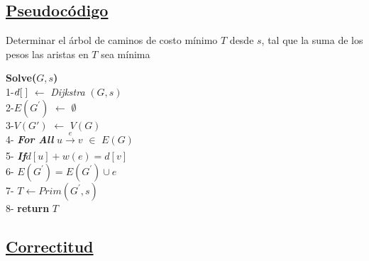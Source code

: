 \documentclass{article}
\begin{document}
    \subsection{\underline{Pseudoc\'odigo}}

    \begin{algorithm}[H]
        \caption{Determinar el \'arbol de caminos de costo m\'inimo $T$ desde $s$, tal que la suma de los pesos las aristas en $T$ sea m\'inima}
        \textbf{Solve($G,s$)}\\ 
        1-\hspace*{0.5em}$d[\hspace*{0.1cm}]$ $\leftarrow $ \textit{Dijkstra} $\left(G,s\right)$ \\  
        2-\hspace*{0.5em}$E (G^{'})$ $\leftarrow$ $\emptyset$ \\ 
        3-\hspace*{0.5em}$V(G')$ $\leftarrow$ $V(G)$\\ 
        4-\hspace*{0.5em} \textbf{\textit{For All }} $u \xrightarrow[]{e} v$  $\in$ $E(G)$\\ 
        5-\hspace*{3em} \textbf{\textit{If}}$d[u] + w(e) = d[v] $\\
        6-\hspace*{6em} $E(G^{'}) = E(G^{'})  \cup  e $ \\ 
        7-\hspace*{0.5em} $T \leftarrow  Prim(G^{'} , s)$\\
        8-\hspace*{0.5em} \textbf{return } $T$ 
    \end{algorithm}
    
    \subsection{\underline{Correctitud}}
\end{document}
